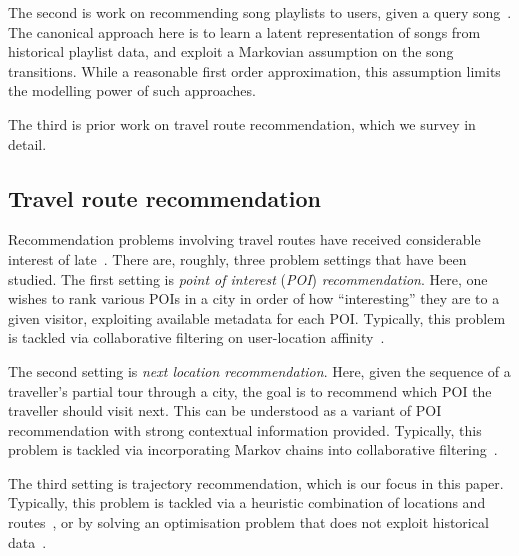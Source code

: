 The second is work on recommending song playlists to users, given a query song~\citep{McFee:2011,chen2012playlist}.
The canonical approach here is to 
learn a latent representation of songs from historical playlist data,
and exploit a Markovian assumption on the song transitions.
While a reasonable first order approximation, this assumption limits the modelling power of such approaches.

The third is prior work on travel route recommendation, which we survey in detail.


\secmoveup
\subsection{Travel route recommendation}
\textmoveup

Recommendation problems involving travel routes have received considerable interest of late~\cite{bao2015recommendations,zheng2015trajectory,zheng2014urban}.
There are, roughly, three problem settings that have been studied.
The first setting is \emph{point of interest} (\emph{POI}) \emph{recommendation}.
Here, one wishes to rank various POIs in a city in order of how ``interesting'' they are to a given visitor,
exploiting
available metadata for each POI.
Typically, this problem is tackled via 
collaborative filtering on user-location affinity~\cite{shi2011personalized,lian2014geomf,hsieh2014mining,yuan2014graph}.

The second setting is \emph{next location recommendation}.
Here, given the sequence of a traveller's partial tour through a city,
the goal is to recommend which POI the traveller should visit next.
This can be understood as a variant of POI recommendation with strong contextual information provided.
Typically, this problem is tackled via 
incorporating Markov chains into collaborative filtering~\cite{fpmc10,ijcai13,zhang2015location}.

The third setting is trajectory recommendation,
which is our focus in this paper.
Typically, this problem is tackled via 
a heuristic combination of locations and routes~\cite{lu2010photo2trip,ijcai15,lu2012personalized}, or
by solving an optimisation problem that does not exploit historical data~\cite{gioniswsdm14,chen2015tripplanner}.



